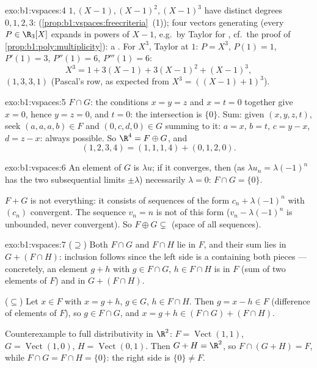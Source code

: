 \begin{solution}{exo:b1:vspaces:4}
 $1, (X-1), (X-1)^2, (X-1)^3$ have distinct degrees $0,
1, 2, 3$:  (\cref{prop:b1:vspaces:freecriteria}~(1)); four 
vectors generating (every $P \in \R_3[X]$ expands in powers of $X -
1$, e.g.\ by Taylor for , cf.\ the proof of
\cref{prop:b1:poly:multiplicity}): a . For $X^3$, Taylor at
$1$: $P = X^3$, $P(1) = 1$, $P'(1) = 3$, $P''(1) = 6$, $P'''(1) =
6$:
\[
X^3 = 1 + 3(X - 1) + 3(X-1)^2 + (X-1)^3 ,
\]
 $(1, 3, 3, 1)$ (Pascal's row, as expected from $X^3 =
((X-1)+1)^3$).
\end{solution}

\begin{solution}{exo:b1:vspaces:5}
$F \cap G$: the conditions $x = y = z$ and $x = t = 0$ together give
$x = 0$, hence $y = z = 0$, and $t = 0$: the intersection is
$\{0\}$. Sum: given $(x,y,z,t)$, seek $(a,a,a,b) \in F$ and
$(0,c,d,0) \in G$ summing to it: $a = x$, $b = t$, $c = y - x$, $d =
z - x$: always possible. So $\R^4 = F \oplus G$, and
\[
(1,2,3,4) = (1,1,1,4) + (0,1,2,0) .
\]
\end{solution}

\begin{solution}{exo:b1:vspaces:6}
An element of $G$ is $\lambda u$; if it converges, then (as
$\lambda u_n = \lambda(-1)^n$ has the two subsequential limits $\pm
\lambda$) necessarily $\lambda = 0$: $F \cap G = \{0\}$.

$F + G$ is not everything: it consists of sequences of the form
$c_n + \lambda(-1)^n$ with $(c_n)$ convergent. The sequence $v_n =
n$ is not of this form ($v_n - \lambda(-1)^n$ is unbounded, never
convergent). So $F \oplus G \subsetneq$ (space of all sequences).
\end{solution}

\begin{solution}{exo:b1:vspaces:7}
($\supseteq$) Both $F \cap G$ and $F \cap H$ lie in $F$, and their
sum lies in $G + (F \cap H)$: inclusion follows since the left side
is a  containing both pieces --- concretely, an element $g +
h$ with $g \in F\cap G$, $h \in F \cap H$ is in $F$ (sum of two
elements of $F$) and in $G + (F \cap H)$.

($\subseteq$) Let $x \in F$ with $x = g + h$, $g \in G$, $h \in F
\cap H$. Then $g = x - h \in F$ (difference of elements of $F$), so
$g \in F \cap G$, and $x = g + h \in (F \cap G) + (F \cap H)$.

Counterexample to full distributivity in $\R^2$: $F =
\operatorname{Vect}(1,1)$, $G = \operatorname{Vect}(1,0)$, $H =
\operatorname{Vect}(0,1)$. Then $G + H = \R^2$, so $F \cap (G+H) =
F$, while $F \cap G = F \cap H = \{0\}$: the right side is $\{0\}
\neq F$.
\end{solution}

